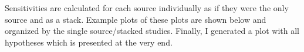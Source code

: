 Sensitivities are calculated for each source individually as if they were the only source and as a stack.
Example plots of these plots are shown below and organized by the single source/stacked studies.
Finally, I generated a plot with all hypotheses which is presented at the very end.


\begin{figure}[t]
\end{figure}
